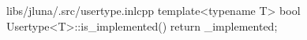 \begin{fileminted}{libs/jluna/.src/usertype.inl}{cpp}
template<typename T>
bool Usertype<T>::is_implemented() {
    return _implemented;
}
\end{fileminted}